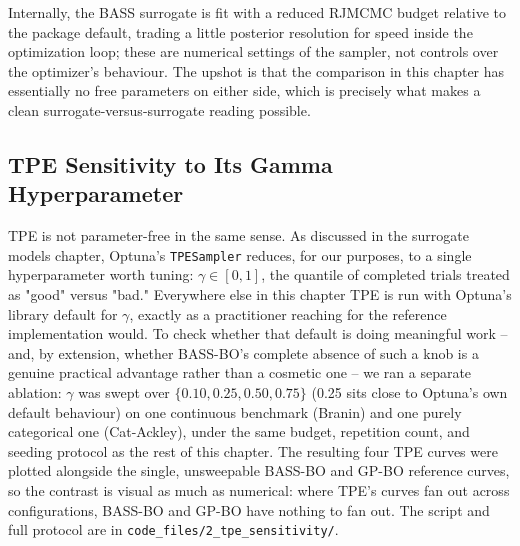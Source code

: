  Internally, the BASS surrogate is fit with a reduced RJMCMC budget relative to the package default, trading a little posterior resolution for speed inside the optimization loop; these are numerical settings of the sampler, not controls over the optimizer's behaviour. The upshot is that the comparison in this chapter has essentially no free parameters on either side, which is precisely what makes a clean surrogate-versus-surrogate reading possible.

\subsection{TPE Sensitivity to Its Gamma Hyperparameter}
\label{tpe_sensitivity_protocol}

TPE is not parameter-free in the same sense. As discussed in the surrogate models chapter, Optuna's \texttt{TPESampler} reduces, for our purposes, to a single hyperparameter worth tuning: $\gamma \in [0,1]$, the quantile of completed trials treated as "good" versus "bad." Everywhere else in this chapter TPE is run with Optuna's library default for $\gamma$, exactly as a practitioner reaching for the reference implementation would. To check whether that default is doing meaningful work -- and, by extension, whether BASS-BO's complete absence of such a knob is a genuine practical advantage rather than a cosmetic one -- we ran a separate ablation: $\gamma$ was swept over $\{0.10, 0.25, 0.50, 0.75\}$ (0.25 sits close to Optuna's own default behaviour) on one continuous benchmark (Branin) and one purely categorical one (Cat-Ackley), under the same budget, repetition count, and seeding protocol as the rest of this chapter. The resulting four TPE curves were plotted alongside the single, unsweepable BASS-BO and GP-BO reference curves, so the contrast is visual as much as numerical: where TPE's curves fan out across configurations, BASS-BO and GP-BO have nothing to fan out. The script and full protocol are in \texttt{code\_files/2\_tpe\_sensitivity/}.

